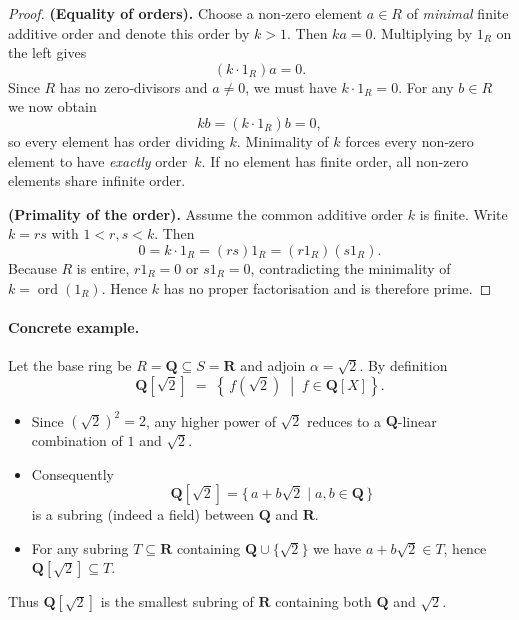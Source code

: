 \documentclass[12pt]{article}
\theoremstyle{definition} %
\theoremstyle{plain} %
\begin{document}
\begin{proof}
\textbf{(Equality of orders).}\;
Choose a non‑zero element \(a\in R\) of \emph{minimal} finite additive order and
denote this order by \(k>1\).  Then \(ka=0\).
Multiplying by \(1_R\) on the left gives
\[
  (k\cdot1_R)a = 0.
\]
Since \(R\) has no zero‑divisors and \(a\neq0\), we must have \(k\cdot1_R=0\).
For any $b\in R$ we now obtain
\[
  kb = (k\cdot1_R)b = 0,
\]
so every element has order dividing $k$.  
Minimality of \(k\) forces every non‑zero element to have \emph{exactly} order~\(k\).
If no element has finite order, all non‑zero elements share infinite order.

\medskip\noindent
\textbf{(Primality of the order).}\;
Assume the common additive order \(k\) is finite.
Write \(k=rs\) with \(1<r,s<k\).
Then
\[
  0 = k\cdot1_R = (rs)1_R = (r1_R)(s1_R).
\]
Because \(R\) is entire, \(r1_R=0\) or \(s1_R=0\),
contradicting the minimality of \(k=\operatorname{ord}(1_R)\).
Hence \(k\) has no proper factorisation and is therefore prime.
\end{proof}
\paragraph{Concrete example.}
Let the base ring be \(R=\mathbf{Q}\subseteq S=\mathbf{R}\) and adjoin \(\alpha=\sqrt2\).
By definition
\[
  \mathbf{Q}[\sqrt2]
  \;=\;
  \left\{\,f(\sqrt2)\;\middle|\;f\in\mathbf{Q}[X]\right\}.
\]

\begin{itemize}
  \item Since \((\sqrt2)^2 = 2\), any higher power of \(\sqrt2\) reduces to a
        \(\mathbf{Q}\)-linear combination of \(1\) and \(\sqrt2\).
  \item Consequently
        \[
          \boxed{\,\mathbf{Q}[\sqrt2]=\{\,a+b\sqrt2\mid a,b\in\mathbf{Q}\,\}\,}
        \]
        is a subring (indeed a field) between \(\mathbf{Q}\) and \(\mathbf{R}\).
  \item For any subring \(T\subseteq\mathbf{R}\) containing
        \(\mathbf{Q}\cup\{\sqrt2\}\) we have \(a+b\sqrt2\in T\), hence
        \(\mathbf{Q}[\sqrt2]\subseteq T\).
\end{itemize}

Thus \(\mathbf{Q}[\sqrt2]\) is the smallest subring of \(\mathbf{R}\) containing
both \(\mathbf{Q}\) and \(\sqrt2\).
\end{document}
